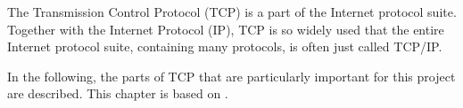 The Transmission Control Protocol (TCP) is a part of the Internet protocol suite. Together with the Internet Protocol (IP), TCP is so widely used that the entire Internet protocol suite, containing many protocols, is often just called TCP/IP.

In the following, the parts of TCP that are particularly important for this project are described. This chapter is based on \cite{wiki-tcp}. 